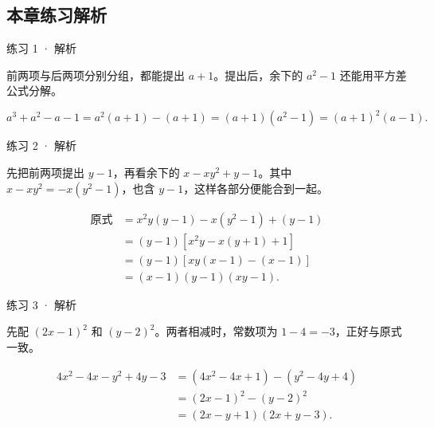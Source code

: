 \subsection*{本章练习解析}




\begin{solution}[before skip=4pt plus 1pt,after skip=4pt plus 1pt,top=6pt,bottom=6pt]{练习 1 · 解析}

\think 前两项与后两项分别分组，都能提出 $a+1$。提出后，余下的 $a^2-1$ 还能用平方差公式分解。

\solve \[a^3+a^2-a-1=a^2(a+1)-(a+1)=(a+1)(a^2-1)=(a+1)^2(a-1).\]


\end{solution}


\begin{solution}[breakable=false,before skip=4pt plus 1pt,after skip=4pt plus 1pt,top=6pt,bottom=6pt]{练习 2 · 解析}

\think 先把前两项提出 $y-1$，再看余下的 $x-xy^2+y-1$。其中 $x-xy^2=-x(y^2-1)$，也含 $y-1$，这样各部分便能合到一起。

\solve \begin{align*}
\text{原式}&=x^2y(y-1)-x(y^2-1)+(y-1)\\
&=(y-1)[x^2y-x(y+1)+1]\\
&=(y-1)[xy(x-1)-(x-1)]\\
&=(x-1)(y-1)(xy-1).
\end{align*}


\end{solution}




\begin{solution}[breakable=false,before skip=4pt plus 1pt,after skip=4pt plus 1pt,top=6pt,bottom=6pt]{练习 3 · 解析}

\think 先配 $(2x-1)^2$ 和 $(y-2)^2$。两者相减时，常数项为 $1-4=-3$，正好与原式一致。

\solve \begin{align*}
4x^2-4x-y^2+4y-3&=(4x^2-4x+1)-(y^2-4y+4)\\
&=(2x-1)^2-(y-2)^2\\
&=(2x-y+1)(2x+y-3).
\end{align*}


\end{solution}

